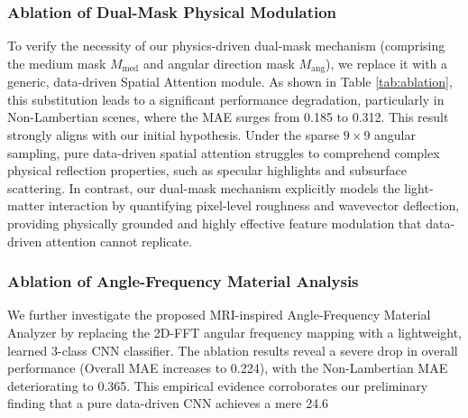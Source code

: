 \subsubsection{Ablation of Dual-Mask Physical Modulation}
To verify the necessity of our physics-driven dual-mask mechanism (comprising the medium mask $M_{\text{med}}$ and angular direction mask $M_{\text{ang}}$), we replace it with a generic, data-driven Spatial Attention module. As shown in Table \ref{tab:ablation}, this substitution leads to a significant performance degradation, particularly in Non-Lambertian scenes, where the MAE surges from 0.185 to 0.312. This result strongly aligns with our initial hypothesis. Under the sparse $9 \times 9$ angular sampling, pure data-driven spatial attention struggles to comprehend complex physical reflection properties, such as specular highlights and subsurface scattering. In contrast, our dual-mask mechanism explicitly models the light-matter interaction by quantifying pixel-level roughness and wavevector deflection, providing physically grounded and highly effective feature modulation that data-driven attention cannot replicate.

\subsubsection{Ablation of Angle-Frequency Material Analysis}
We further investigate the proposed MRI-inspired Angle-Frequency Material Analyzer by replacing the 2D-FFT angular frequency mapping with a lightweight, learned 3-class CNN classifier. The ablation results reveal a severe drop in overall performance (Overall MAE increases to 0.224), with the Non-Lambertian MAE deteriorating to 0.365. This empirical evidence corroborates our preliminary finding that a pure data-driven CNN achieves a mere 24.6\\%

